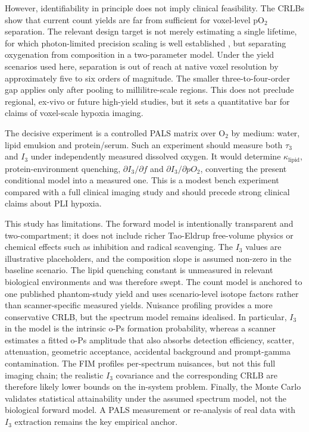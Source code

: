 \documentclass[pdflatex,sn-mathphys-num]{sn-jnl}
\begin{document}
However, identifiability in principle does not imply clinical feasibility. The CRLBs show that current count yields are far from sufficient for voxel-level pO\(_2\) separation. The relevant design target is not merely estimating a single lifetime, for which photon-limited precision scaling is well established \cite{ref8,ref9}, but separating oxygenation from composition in a two-parameter model. Under the yield scenarios used here, separation is out of reach at native voxel resolution by approximately five to six orders of magnitude. The smaller three-to-four-order gap applies only after pooling to millilitre-scale regions. This does not preclude regional, ex-vivo or future high-yield studies, but it sets a quantitative bar for claims of voxel-scale hypoxia imaging.

The decisive experiment is a controlled PALS matrix over O\(_2\) by medium: water, lipid emulsion and protein/serum. Such an experiment should measure both \(\tau_3\) and \(I_3\) under independently measured dissolved oxygen. It would determine \(\kappa_{\mathrm{lipid}}\), protein-environment quenching, \(\partial I_3/\partial f\) and \(\partial I_3/\partial pO_2\), converting the present conditional model into a measured one. This is a modest bench experiment compared with a full clinical imaging study and should precede strong clinical claims about PLI hypoxia.

This study has limitations. The forward model is intentionally transparent and two-compartment; it does not include richer Tao-Eldrup free-volume physics or chemical effects such as inhibition and radical scavenging. The \(I_3\) values are illustrative placeholders, and the composition slope is assumed non-zero in the baseline scenario. The lipid quenching constant is unmeasured in relevant biological environments and was therefore swept. The count model is anchored to one published phantom-study yield and uses scenario-level isotope factors rather than scanner-specific measured yields. Nuisance profiling provides a more conservative CRLB, but the spectrum model remains idealised. In particular, \(I_3\) in the model is the intrinsic o-Ps formation probability, whereas a scanner estimates a fitted o-Ps amplitude that also absorbs detection efficiency, scatter, attenuation, geometric acceptance, accidental background and prompt-gamma contamination. The FIM profiles per-spectrum nuisances, but not this full imaging chain; the realistic \(I_3\) covariance and the corresponding CRLB are therefore likely lower bounds on the in-system problem. Finally, the Monte Carlo validates statistical attainability under the assumed spectrum model, not the biological forward model. A PALS measurement or re-analysis of real data with \(I_3\) extraction remains the key empirical anchor.
\end{document}
